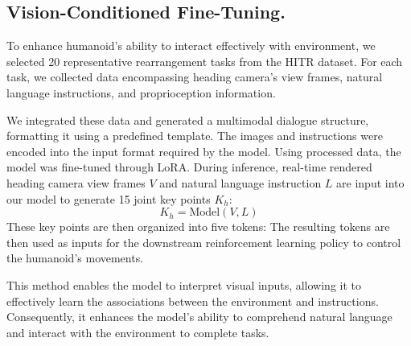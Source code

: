 \subsection{Vision-Conditioned Fine-Tuning.}

To enhance humanoid's ability to interact effectively with environment, we selected 20 representative rearrangement tasks from the HITR dataset. For each task, we collected data encompassing heading camera's view frames, natural language instructions, and proprioception information.

We integrated these data and generated a multimodal dialogue structure, formatting it using a predefined template. The images and instructions were encoded into the input format required by the model. Using processed data, the model was fine-tuned through LoRA. 
During inference, real-time rendered heading camera view frames \( V \) and natural language instruction \( L \) are input into our model to generate 15 joint key points \( K_h \):
\[
K_h = \text{Model}(V, L)
\]
These key points are then organized into five tokens:
The resulting tokens are then used as inputs for the downstream reinforcement learning policy to control the humanoid’s movements. 

This method enables the model to interpret visual inputs, allowing it to effectively learn the associations between the environment and  instructions. Consequently, it enhances the model's ability to comprehend natural language and interact with the environment to complete tasks.


